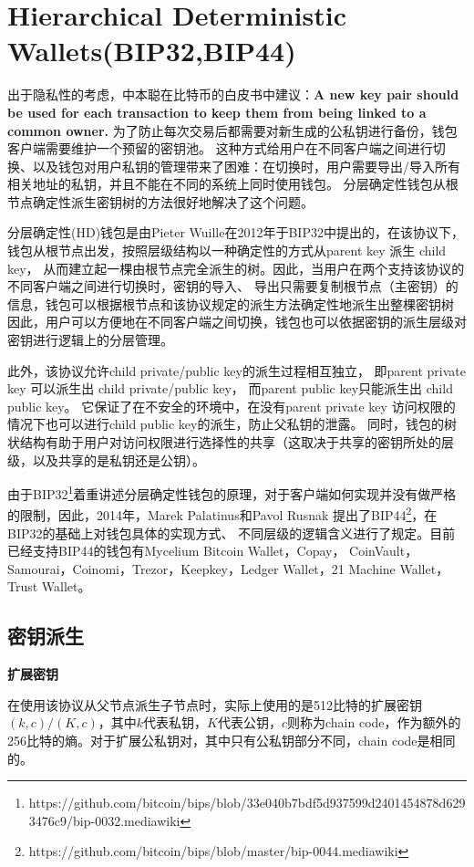 \section{Hierarchical Deterministic Wallets(BIP32,BIP44)}

出于隐私性的考虑，中本聪在比特币的白皮书中建议：\textbf{A new key pair should be used 
for each transaction to keep them from being linked to a common owner.} 
为了防止每次交易后都需要对新生成的公私钥进行备份，钱包客户端需要维护一个预留的密钥池。
这种方式给用户在不同客户端之间进行切换、以及钱包对用户私钥的管理带来了困难：在切换时，用户需要导出/导入所有相关地址的私钥，并且不能在不同的系统上同时使用钱包。
分层确定性钱包从根节点确定性派生密钥树的方法很好地解决了这个问题。

分层确定性(HD)钱包是由Pieter Wuille在2012年于BIP32中提出的，在该协议下，
钱包从根节点出发，按照层级结构以一种确定性的方式从parent key 派生 child key，
从而建立起一棵由根节点完全派生的树。因此，当用户在两个支持该协议的不同客户端之间进行切换时，密钥的导入、
导出只需要复制根节点（主密钥）的信息，钱包可以根据根节点和该协议规定的派生方法确定性地派生出整棵密钥树
因此，用户可以方便地在不同客户端之间切换，钱包也可以依据密钥的派生层级对密钥进行逻辑上的分层管理。
  
此外，该协议允许child private/public key的派生过程相互独立，
即parent private key 可以派生出 child private/public key，
而parent public key只能派生出 child public key。
它保证了在不安全的环境中，在没有parent private key 访问权限的情况下也可以进行child public key的派生，防止父私钥的泄露。
同时，钱包的树状结构有助于用户对访问权限进行选择性的共享（这取决于共享的密钥所处的层级，以及共享的是私钥还是公钥）。  

由于BIP32\footnote{https://github.com/bitcoin/bips/blob/33e040b7bdf5d937599d2401454878d6293476c9/bip-0032.mediawiki}着重讲述分层确定性钱包的原理，对于客户端如何实现并没有做严格的限制，因此，2014年，Marek Palatinus和Pavol Rusnak 提出了BIP44\footnote{https://github.com/bitcoin/bips/blob/master/bip-0044.mediawiki}，在BIP32的基础上对钱包具体的实现方式、 不同层级的逻辑含义进行了规定。目前已经支持BIP44的钱包有Mycelium Bitcoin Wallet，Copay， CoinVault，Samourai，Coinomi，Trezor，Keepkey，Ledger Wallet，21 Machine Wallet， Trust Wallet。  

\subsection{密钥派生}

\textbf{扩展密钥}

 在使用该协议从父节点派生子节点时，实际上使用的是512比特的扩展密钥$(k,c)/(K,c)$，其中$k$代表私钥，$K$代表公钥，$c$则称为chain code，作为额外的256比特的熵。对于扩展公私钥对，其中只有公私钥部分不同，chain code是相同的。
 
